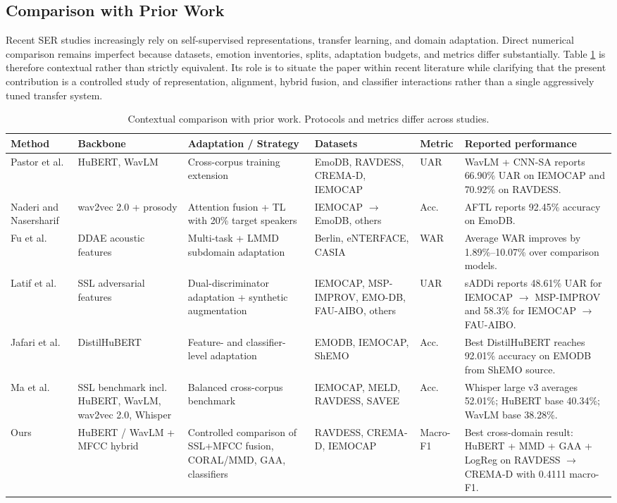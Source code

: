 \documentclass[9pt,twocolumn,letterpaper]{article}
\begin{document}
\subsection{Comparison with Prior Work}
Recent SER studies increasingly rely on self-supervised representations, transfer learning, and domain adaptation. Direct numerical comparison remains imperfect because datasets, emotion inventories, splits, adaptation budgets, and metrics differ substantially. Table \ref{tab:prior_work} is therefore contextual rather than strictly equivalent. Its role is to situate the paper within recent literature while clarifying that the present contribution is a controlled study of representation, alignment, hybrid fusion, and classifier interactions rather than a single aggressively tuned transfer system.

\begin{table}[t]
\centering
\caption{Contextual comparison with prior work. Protocols and metrics differ across studies.}
\label{tab:prior_work}
\scriptsize
\setlength{\tabcolsep}{2pt}
\begin{tabular}{p{1.9cm}p{1.6cm}p{2.7cm}p{2.1cm}p{1.0cm}p{3.2cm}}
\toprule
Method & Backbone & Adaptation / Strategy & Datasets & Metric & Reported performance \\
\midrule
Pastor et al. \cite{pastor2023cross} & HuBERT, WavLM & Cross-corpus training extension & EmoDB, RAVDESS, CREMA-D, IEMOCAP & UAR & WavLM + CNN-SA reports 66.90\% UAR on IEMOCAP and 70.92\% on RAVDESS. \\
Naderi and Nasersharif \cite{naderi2023cross} & wav2vec 2.0 + prosody & Attention fusion + TL with 20\% target speakers & IEMOCAP $\rightarrow$ EmoDB, others & Acc. & AFTL reports 92.45\% accuracy on EmoDB. \\
Fu et al. \cite{fu2023cross} & DDAE acoustic features & Multi-task + LMMD subdomain adaptation & Berlin, eNTERFACE, CASIA & WAR & Average WAR improves by 1.89\%--10.07\% over comparison models. \\
Latif et al. \cite{latif2023self} & SSL adversarial features & Dual-discriminator adaptation + synthetic augmentation & IEMOCAP, MSP-IMPROV, EMO-DB, FAU-AIBO, others & UAR & sADDi reports 48.61\% UAR for IEMOCAP $\rightarrow$ MSP-IMPROV and 58.3\% for IEMOCAP $\rightarrow$ FAU-AIBO. \\
Jafari et al. \cite{jafari2025feature} & DistilHuBERT & Feature- and classifier-level adaptation & EMODB, IEMOCAP, ShEMO & Acc. & Best DistilHuBERT reaches 92.01\% accuracy on EMODB from ShEMO source. \\
Ma et al. \cite{ma2024emobox} & SSL benchmark incl. HuBERT, WavLM, wav2vec 2.0, Whisper & Balanced cross-corpus benchmark & IEMOCAP, MELD, RAVDESS, SAVEE & Acc. & Whisper large v3 averages 52.01\%; HuBERT base 40.34\%; WavLM base 38.28\%. \\
Ours & HuBERT / WavLM + MFCC hybrid & Controlled comparison of SSL+MFCC fusion, CORAL/MMD, GAA, classifiers & RAVDESS, CREMA-D, IEMOCAP & Macro-F1 & Best cross-domain result: HuBERT + MMD + GAA + LogReg on RAVDESS $\rightarrow$ CREMA-D with 0.4111 macro-F1. \\
\bottomrule
\end{tabular}
\end{table}
\end{document}
